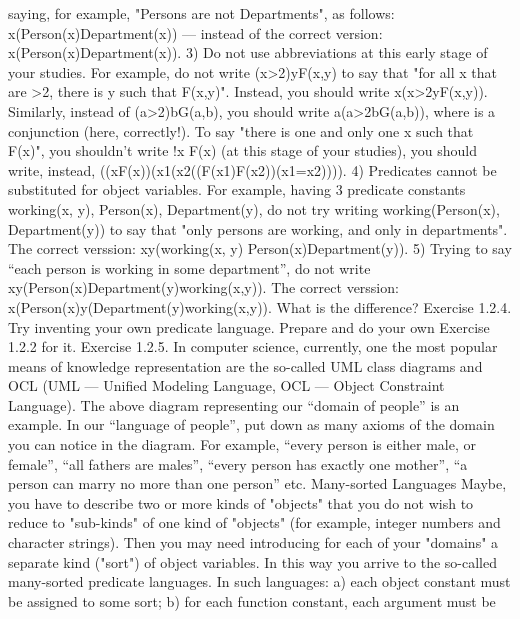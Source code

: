 saying, for example, "Persons are not Departments", as follows:
\forall x(Person(x)\AND \neg Department(x)) --- instead of the correct version: \forall x(Person(x)\IMPLIES \neg Department(x)).
3) Do not use abbreviations at this early stage of your studies. For example, do not write (\forall x>2)\exists yF(x,y)
to say that "for all x that are >2, there is y such that F(x,y)". Instead, you should write
\forall x(x>2\IMPLIES \exists yF(x,y)). Similarly, instead of (\exists a>2)\exists bG(a,b), you should write \exists a(a>2\AND \exists bG(a,b)), where
\AND  is a conjunction (here, correctly!).
To say "there is one and only one x such that F(x)", you shouldn't write \exists !x F(x) (at this stage of your
studies), you should write, instead, ((\exists xF(x))\AND (\forall x1(\forall x2((F(x1)\AND F(x2))\IMPLIES (x1=x2)))).
4) Predicates cannot be substituted for object variables. For example, having 3 predicate constants
working(x, y), Person(x), Department(y), do not try writing working(Person(x), Department(y)) to say
that "only persons are working, and only in departments". The correct verssion: \forall x\forall y(working(x, y)\IMPLIES 
Person(x)\AND Department(y)).
5) Trying to say ``each person is working in some department'', do not write
\forall x\exists y(Person(x)\AND Department(y)\IMPLIES working(x,y)). The correct verssion:
\forall x(Person(x)\IMPLIES \exists y(Department(y)\AND working(x,y)). What is the difference?
Exercise 1.2.4. Try inventing your own predicate language. Prepare and do your own Exercise 1.2.2 for
it.
Exercise 1.2.5. In computer science, currently, one the most popular means of knowledge representation
are the so-called UML class diagrams and OCL (UML --- Unified Modeling Language, OCL --- Object
Constraint Language). The above diagram representing our ``domain of people'' is an example. In our
``language of people'', put down as many axioms of the domain you can notice in the diagram. For
example, ``every person is either male, or female'', ``all fathers are males'', ``every person has exactly one
mother'', ``a person can marry no more than one person'' etc.
Many-sorted Languages
Maybe, you have to describe two or more kinds of "objects" that you do not wish to reduce to "sub-kinds" of one kind of
"objects" (for example, integer numbers and character strings). Then you may need introducing for each of your "domains" a
separate kind ("sort") of object variables. In this way you arrive to the so-called many-sorted predicate languages. In such
languages: a) each object constant must be assigned to some sort; b) for each function constant, each argument must be
